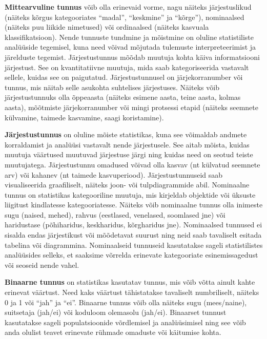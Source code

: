 \documentclass[
]{book}
\begin{document}
\textbf{Mittearvuline tunnus} võib olla erinevaid vorme, nagu näiteks järjestuslikud (näiteks kõrgus kategooriates ``madal'', ``keskmine'' ja ``kõrge''), nominaalsed (näiteks puu liikide nimetused) või ordinaalsed (näiteks kasvuala klassifikatsioon). Nende tunnuste tundmine ja mõistmine on oluline statistiliste analüüside tegemisel, kuna need võivad mõjutada tulemuste interpreteerimist ja järelduste tegemist.
Järjestustunnus mõõdab muutuja kohta käiva informatsiooni järjestust. See on kvantitatiivne muutuja, mida saab kategoriseerida vastavalt sellele, kuidas see on paigutatud. Järjestustunnusel on järjekorranumber või tunnus, mis näitab selle asukohta suhtelises järjestuses. Näiteks võib järjestustunnuks olla õppeaasta (näiteks esimene aasta, teine aasta, kolmas aasta), mõõtmiste järjekorranumber või mingi protsessi etapid (näiteks seemnete külvamine, taimede kasvamine, saagi koristamine).

\textbf{Järjestustunnus} on oluline mõiste statistikas, kuna see võimaldab andmete korraldamist ja analüüsi vastavalt nende järjestusele. See aitab mõista, kuidas muutuja väärtused muutuvad järjestuse järgi ning kuidas need on seotud teiste muutujatega. Järjestustunnu omadused võivad olla kasvav (nt külvatud seemnete arv) või kahanev (nt taimede kasvuperiood). Järjestustunnuseid saab visualiseerida graafiliselt, näiteks joon- või tulpdiagrammide abil.
Nominaalne tunnus on statistikas kategooriline muutuja, mis kirjeldab objektide või üksuste liigitust kindlatesse kategooriatesse. Näiteks võib nominaalne tunnus olla inimeste sugu (naised, mehed), rahvus (eestlased, venelased, soomlased jne) või haridustase (põhiharidus, keskharidus, kõrgharidus jne). Nominaalsed tunnused ei sisalda endas järjestikust või mõõdetavat suurust ning neid saab tavaliselt esitada tabelina või diagrammina. Nominaalseid tunnuseid kasutatakse sageli statistilistes analüüsides selleks, et saaksime võrrelda erinevate kategooriate esinemissagedust või seoseid nende vahel.

\textbf{Binaarne tunnus} on statistikas kasutatav tunnus, mis võib võtta ainult kahte erinevat väärtust. Need kaks väärtust tähistatakse tavaliselt numbriliselt, näiteks 0 ja 1 või ``jah'' ja ``ei''. Binaarne tunnus võib olla näiteks sugu (mees/naine), suitsetaja (jah/ei) või koduloom olemasolu (jah/ei). Binaarset tunnust kasutatakse sageli populatsioonide võrdlemisel ja analüüsimisel ning see võib anda olulist teavet erinevate rühmade omaduste või käitumise kohta.
\end{document}
